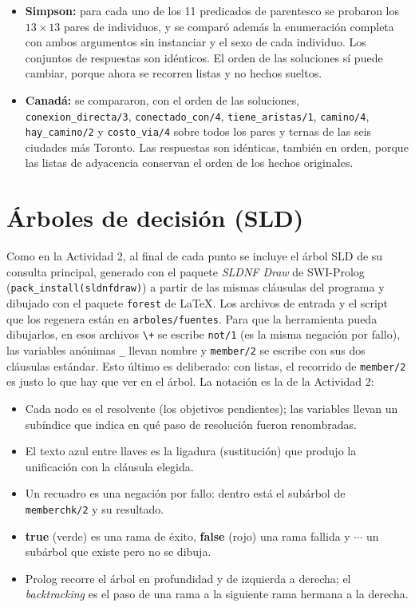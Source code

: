 \documentclass[12pt]{report}
\begin{document}
\begin{itemize}
    \item \textbf{Simpson:} para cada uno de los 11 predicados de parentesco
          se probaron los $13 \times 13$ pares de individuos, y se
          comparó además la enumeración completa con ambos argumentos sin
          instanciar y el sexo de cada individuo. Los conjuntos de
          respuestas son idénticos. El orden de las soluciones sí puede
          cambiar, porque ahora se recorren listas y no hechos sueltos.
    \item \textbf{Canadá:} se compararon, con el orden de las soluciones,
          \texttt{conexion\_directa/3}, \texttt{conectado\_con/4},
          \texttt{tiene\_aristas/1}, \texttt{camino/4}, \texttt{hay\_camino/2}
          y \texttt{costo\_via/4} sobre todos los pares y ternas de las seis
          ciudades más Toronto. Las respuestas son idénticas, también en
          orden, porque las listas de adyacencia conservan el orden de los
          hechos originales.
\end{itemize}

\section*{Árboles de decisión (SLD)}

Como en la Actividad 2, al final de cada punto se incluye el árbol SLD de
su consulta principal, generado con el paquete \emph{SLDNF Draw} de
SWI-Prolog (\texttt{pack\_install(sldnfdraw)}) a partir de las mismas
cláusulas del programa y dibujado con el paquete \texttt{forest} de
\LaTeX{}. Los archivos de entrada y el script que los regenera están en
\texttt{arboles/fuentes}. Para que la herramienta pueda dibujarlos, en esos
archivos \verb|\+| se escribe \texttt{not/1} (es la misma negación por
fallo), las variables anónimas \texttt{\_} llevan nombre y
\texttt{member/2} se escribe con sus dos cláusulas estándar. Esto último es
deliberado: con listas, el recorrido de \texttt{member/2} es justo lo que
hay que ver en el árbol. La notación es la de la Actividad 2:

\begin{itemize}
    \item Cada nodo es el resolvente (los objetivos pendientes); las
          variables llevan un subíndice que indica en qué paso de
          resolución fueron renombradas.
    \item El texto azul entre llaves es la ligadura (sustitución) que
          produjo la unificación con la cláusula elegida.
    \item Un recuadro es una negación por fallo: dentro está el subárbol
          de \texttt{memberchk/2} y su resultado.
    \item \textbf{true} (verde) es una rama de éxito, \textbf{false} (rojo)
          una rama fallida y $\cdots$ un subárbol que existe pero no se
          dibuja.
    \item Prolog recorre el árbol en profundidad y de izquierda a derecha;
          el \emph{backtracking} es el paso de una rama a la siguiente rama
          hermana a la derecha.
\end{itemize}
\end{document}
